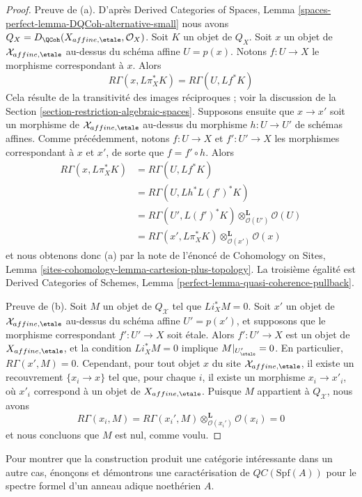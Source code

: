 \begin{proof}
\medskip\noindent
Preuve de (a). D'après Derived Categories of Spaces, Lemma
\ref{spaces-perfect-lemma-DQCoh-alternative-small}
nous avons $Q_X = D_\QCoh(X_{affine, \etale}, \mathcal{O}_X)$.
Soit $K$ un objet de $Q_X$. Soit $x$ un objet de
$\mathcal{X}_{affine, \etale}$ au-dessus du schéma
affine $U = p(x)$. Notons $f : U \to X$ le morphisme correspondant
à $x$. Alors
$$
R\Gamma(x, L\pi_X^*K) = R\Gamma(U, Lf^*K)
$$
Cela résulte de la transitivité des images réciproques ; voir la discussion de la
Section \ref{section-restriction-algebraic-spaces}.
Supposons ensuite que $x \to x'$ soit un morphisme de $\mathcal{X}_{affine, \etale}$
au-dessus du morphisme $h : U \to U'$ de schémas affines.
Comme précédemment, notons $f : U \to X$ et $f' : U' \to X$ les morphismes
correspondant à $x$ et $x'$, de sorte que $f = f' \circ h$.
Alors
\begin{align*}
R\Gamma(x, L\pi_X^*K)
& =
R\Gamma(U, Lf^*K) \\
& =
R\Gamma(U, Lh^*L(f')^*K) \\
& =
R\Gamma(U', L(f')^*K) \otimes_{\mathcal{O}(U')}^\mathbf{L} \mathcal{O}(U) \\
& =
R\Gamma(x', L\pi_X^*K) \otimes_{\mathcal{O}(x')}^\mathbf{L} \mathcal{O}(x)
\end{align*}
et nous obtenons donc (a) par la note de l'énoncé de
Cohomology on Sites, Lemma
\ref{sites-cohomology-lemma-cartesion-plus-topology}. La troisième égalité est
Derived Categories of Schemes, Lemma
\ref{perfect-lemma-quasi-coherence-pullback}.

\medskip\noindent
Preuve de (b). Soit $M$ un objet de $Q_\mathcal{X}$
tel que $Li_X^*M = 0$. Soit $x'$ un objet de $\mathcal{X}_{affine, \etale}$
au-dessus du schéma affine $U' = p(x')$, et supposons que le morphisme
correspondant $f' : U' \to X$ soit étale. Alors $f' : U' \to X$ est un objet de
$X_{affine, \etale}$, et la condition $Li_X^*M = 0$ implique
$M|_{U'_\etale} = 0$. En particulier, $R\Gamma(x', M) = 0$.
Cependant, pour tout objet $x$ du site
$\mathcal{X}_{affine, \etale}$, il existe un recouvrement $\{x_i \to x\}$
tel que, pour chaque $i$, il existe un morphisme $x_i \to x'_i$, où
$x'_i$ correspond à un objet de $X_{affine, \etale}$.
Puisque $M$ appartient à $Q_\mathcal{X}$, nous avons
$$
R\Gamma(x_i, M) =
R\Gamma(x_i', M) \otimes_{\mathcal{O}(x_i')}^\mathbf{L} \mathcal{O}(x_i) =
0
$$
et nous concluons que $M$ est nul, comme voulu.
\end{proof}

\noindent
Pour montrer que la construction produit une catégorie intéressante dans un autre
cas, énonçons et démontrons une caractérisation de
$\mathit{QC}(\text{Spf}(A))$ pour le spectre formel d'un
anneau adique noethérien $A$.

